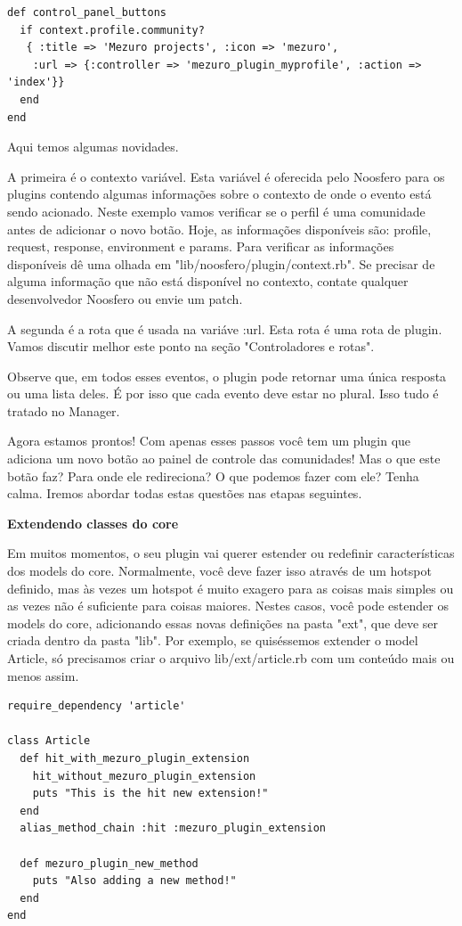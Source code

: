 \documentclass[11pt]{article}
\begin{document}
\begin{Verbatim}[frame=single,fontfamily=courier]
def control_panel_buttons
  if context.profile.community?
   { :title => 'Mezuro projects', :icon => 'mezuro', 
    :url => {:controller => 'mezuro_plugin_myprofile', :action => 'index'}}
  end
end
\end{Verbatim}

Aqui temos algumas novidades.

A primeira é o contexto variável. Esta variável é oferecida pelo Noosfero para
os plugins contendo algumas informações sobre o contexto de onde o evento está
sendo acionado. Neste exemplo vamos verificar se o perfil é uma comunidade
antes de adicionar o novo botão. Hoje, as informações disponíveis são:
profile, request, response, environment e params. Para verificar as
informações disponíveis dê uma olhada em "lib/noosfero/plugin/context.rb". Se
precisar de alguma informação que não está disponível no contexto, contate
qualquer desenvolvedor Noosfero ou envie um patch.

A segunda é a rota que é usada na variáve :url. Esta rota é uma rota de
plugin. Vamos discutir melhor este ponto na seção "Controladores e rotas".

Observe que, em todos esses eventos, o plugin pode retornar uma única resposta
ou uma lista deles. É por isso que cada evento deve estar no plural. Isso tudo
é tratado no Manager.

Agora estamos prontos! Com apenas esses passos você tem um plugin que adiciona
um novo botão ao painel de controle das comunidades! Mas o que este botão faz?
Para onde ele redireciona? O que podemos fazer com ele? Tenha calma. Iremos
abordar todas estas questões nas etapas seguintes.

{\bf Extendendo classes do core}

Em muitos momentos, o seu plugin vai querer estender ou redefinir
características dos models do core. Normalmente, você deve fazer isso através
de um hotspot definido, mas às vezes um hotspot é muito exagero para as coisas
mais simples ou as vezes não é suficiente para coisas maiores. Nestes casos,
você pode estender os models do core, adicionando essas novas definições na
pasta "ext", que deve ser criada dentro da pasta "lib". Por exemplo, se
quiséssemos extender o model Article, só precisamos criar o arquivo
lib/ext/article.rb com um conteúdo mais ou menos assim.

\begin{Verbatim}[frame=single,fontfamily=courier]
require_dependency 'article'
 
class Article
  def hit_with_mezuro_plugin_extension
    hit_without_mezuro_plugin_extension
    puts "This is the hit new extension!"
  end
  alias_method_chain :hit :mezuro_plugin_extension
 
  def mezuro_plugin_new_method
    puts "Also adding a new method!"
  end
end
\end{Verbatim}
\end{document}
